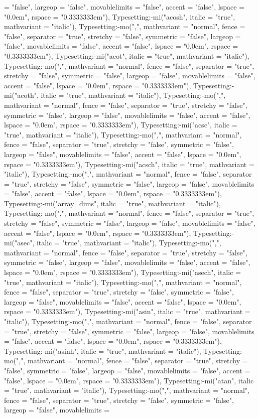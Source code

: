 \documentclass{article}
\begin{document}
{{{\begin{maplegroup}
\begin{maplelatex}
= "false", largeop = "false", movablelimits = "false", accent = "false", lspace = "0.0em", rspace = "0.3333333em"), Typesetting:-mi("acosh", italic = "true", mathvariant = "italic"), Typesetting:-mo(",", mathvariant = "normal", fence = "false", separator = "true", stretchy = "false", symmetric = "false", largeop = "false", movablelimits = "false", accent = "false", lspace = "0.0em", rspace = "0.3333333em"), Typesetting:-mi("acot", italic = "true", mathvariant = "italic"), Typesetting:-mo(",", mathvariant = "normal", fence = "false", separator = "true", stretchy = "false", symmetric = "false", largeop = "false", movablelimits = "false", accent = "false", lspace = "0.0em", rspace = "0.3333333em"), Typesetting:-mi("acoth", italic = "true", mathvariant = "italic"), Typesetting:-mo(",", mathvariant = "normal", fence = "false", separator = "true", stretchy = "false", symmetric = "false", largeop = "false", movablelimits = "false", accent = "false", lspace = "0.0em", rspace = "0.3333333em"), Typesetting:-mi("acsc", italic = "true", mathvariant = "italic"), Typesetting:-mo(",", mathvariant = "normal", fence = "false", separator = "true", stretchy = "false", symmetric = "false", largeop = "false", movablelimits = "false", accent = "false", lspace = "0.0em", rspace = "0.3333333em"), Typesetting:-mi("acsch", italic = "true", mathvariant = "italic"), Typesetting:-mo(",", mathvariant = "normal", fence = "false", separator = "true", stretchy = "false", symmetric = "false", largeop = "false", movablelimits = "false", accent = "false", lspace = "0.0em", rspace = "0.3333333em"), Typesetting:-mi("array_dims", italic = "true", mathvariant = "italic"), Typesetting:-mo(",", mathvariant = "normal", fence = "false", separator = "true", stretchy = "false", symmetric = "false", largeop = "false", movablelimits = "false", accent = "false", lspace = "0.0em", rspace = "0.3333333em"), Typesetting:-mi("asec", italic = "true", mathvariant = "italic"), Typesetting:-mo(",", mathvariant = "normal", fence = "false", separator = "true", stretchy = "false", symmetric = "false", largeop = "false", movablelimits = "false", accent = "false", lspace = "0.0em", rspace = "0.3333333em"), Typesetting:-mi("asech", italic = "true", mathvariant = "italic"), Typesetting:-mo(",", mathvariant = "normal", fence = "false", separator = "true", stretchy = "false", symmetric = "false", largeop = "false", movablelimits = "false", accent = "false", lspace = "0.0em", rspace = "0.3333333em"), Typesetting:-mi("asin", italic = "true", mathvariant = "italic"), Typesetting:-mo(",", mathvariant = "normal", fence = "false", separator = "true", stretchy = "false", symmetric = "false", largeop = "false", movablelimits = "false", accent = "false", lspace = "0.0em", rspace = "0.3333333em"), Typesetting:-mi("asinh", italic = "true", mathvariant = "italic"), Typesetting:-mo(",", mathvariant = "normal", fence = "false", separator = "true", stretchy = "false", symmetric = "false", largeop = "false", movablelimits = "false", accent = "false", lspace = "0.0em", rspace = "0.3333333em"), Typesetting:-mi("atan", italic = "true", mathvariant = "italic"), Typesetting:-mo(",", mathvariant = "normal", fence = "false", separator = "true", stretchy = "false", symmetric = "false", largeop = "false", movablelimits = 
\end{maplelatex}
\end{maplegroup}}}}
\end{document}
